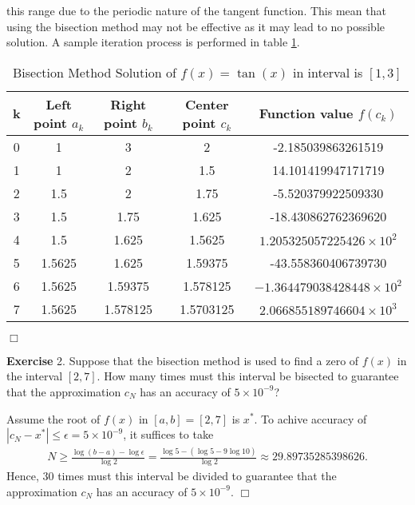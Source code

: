\documentclass[UTF8,12pt,hyperref]{ctexart}
\makeatletter
\newenvironment{exercise}[1][{\color{blue}\bf Exercise}]%
{%
 \begin{center}   \begin{lrbox}{\@tempboxa}%
    \begin{minipage}{\textwidth}%
  {\color{blue}\bfseries
#1}   }{%
    \end{minipage}%
    \end{lrbox}
    \colorbox{green}{\noindent\usebox{\@tempboxa}} \end{center}  
}
\newenvironment{solve}[1][\color{blue}\bf Solve]{\begin{trivlist}
\item[\hskip \labelsep {\color{blue}\bfseries
#1}]}{\hfill$\Box$\end{trivlist}}
\makeatother
\begin{document}
\begin{solve}
  this range due to the periodic nature of the tangent function. This mean that using the 
  bisection method may not be effective as it may lead to no possible solution.
  A sample iteration process is performed in table \ref{table2}.
  \begin{table}[htbp]
		\centering
		\caption{Bisection Method Solution of $f(x) = \tan(x)$ in interval is $[1,3]$}
		\label{table2}
    \begin{tabular}{c|c|c|c|c}
			k & Left point $a_{k}$ & Right point $b_{k}$ & Center point $c_{k}$ & Function value  $f(c_{k})$\\
			\hline
			0 & 1 & 3 & 2 & -2.185039863261519 \\
			1 & 1 & 2 & 1.5  & 14.101419947171719 \\
			2 & 1.5 & 2 & 1.75 & -5.520379922509330 \\
			3 & 1.5 & 1.75 &  1.625 & -18.430862762369620 \\
			4 & 1.5 & 1.625 & 1.5625 & $1.205325057225426\times 10^2$\\
			5 & 1.5625 & 1.625 & 1.59375 & -43.558360406739730 \\
			6 & 1.5625  & 1.59375 &  1.578125  & $-1.364479038428448 \times 10^2$\\
			7 & 1.5625  & 1.578125  &  1.5703125  & $2.066855189746604 \times 10^3$
		\end{tabular}
	\end{table}

\end{solve}
 


\begin{exercise}2.\qquad  
 Suppose that the bisection method is used to find a zero of $f(x)$ in the interval $[2, 7]$. How many times must this interval be bisected to guarantee that the approximation $c_N$ has an accuracy of $5 \times 10^{-9}$?
\end{exercise}
 
\begin{solve}
  Assume the root of $f(x)$ in $[a,b]=[2,7]$ is $x^*$. 
  To achive accuracy of $|c_N-x^*|\leqslant \epsilon=5\times 10^{-9}$,
  it suffices to take
  \begin{align*}
    N\geqslant \frac{\log(b-a)-\log\epsilon}{\log2}=\frac{\log 5-(\log 5-9\log 10)}{\log2}\approx 29.89735285398626.
  \end{align*}
  Hence, $30$ times must this interval be divided to guarantee
  that the approximation $c_N$ has an accuracy of $5\times 10^{-9}$.
\end{solve}
\end{document}

